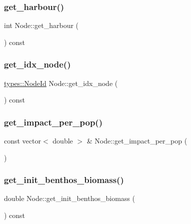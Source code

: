 \mbox{\label{class_node_adfebff564c1983113fb8e32f876c4667}} 
\subsubsection{\texorpdfstring{get\_harbour()}{get\_harbour()}}
{\footnotesize\ttfamily int Node\+::get\+\_\+harbour (\begin{DoxyParamCaption}{ }\end{DoxyParamCaption}) const}

\mbox{\label{class_node_abc4143a5efe9b5b1cc6dfaf4069ee29f}} 
\subsubsection{\texorpdfstring{get\_idx\_node()}{get\_idx\_node()}}
{\footnotesize\ttfamily \mbox{\hyperlink{classtypes_1_1_node_id}{types\+::\+Node\+Id}} Node\+::get\+\_\+idx\+\_\+node (\begin{DoxyParamCaption}{ }\end{DoxyParamCaption}) const}

\mbox{\label{class_node_a33d7128083c22b1aff22e81149fc8821}} 
\subsubsection{\texorpdfstring{get\_impact\_per\_pop()}{get\_impact\_per\_pop()}}
{\footnotesize\ttfamily const vector$<$ double $>$ \& Node\+::get\+\_\+impact\+\_\+per\+\_\+pop (\begin{DoxyParamCaption}{ }\end{DoxyParamCaption})}

\mbox{\label{class_node_a54ee44b64bc2b4429597dd2d51d6112c}} 
\subsubsection{\texorpdfstring{get\_init\_benthos\_biomass()}{get\_init\_benthos\_biomass()}}
{\footnotesize\ttfamily double Node\+::get\+\_\+init\+\_\+benthos\+\_\+biomass (\begin{DoxyParamCaption}{ }\end{DoxyParamCaption}) const}

